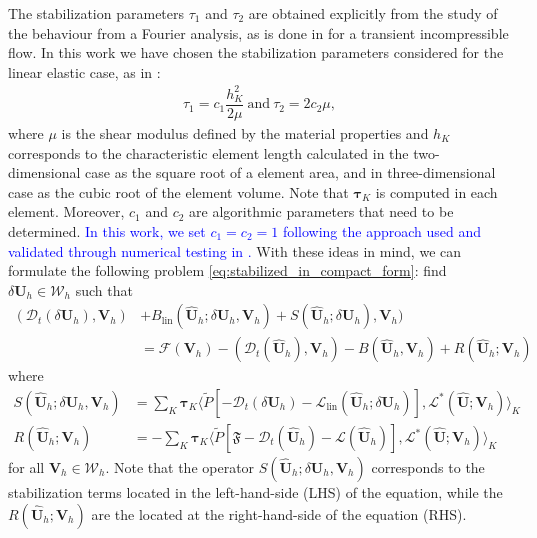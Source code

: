 \documentclass[11pt,english]{article}
\newcommand{\LM}[1]{\textcolor{blue}{#1}}
\def\SpaceTotal{\boldsymbol{\mathcal{W}}}
\def\TestFunctions{\boldsymbol{V}}
\def\UnkVariables{\boldsymbol{U}}
\def\DerB{B_{\text{lin}}}
\def\D{\mathcal{D}}
\def\L{\mathcal{L}}
\def\DerL{\mathcal{L}_{\text{lin}}}
\begin{document}
    The stabilization parameters $\tau_1$ and $\tau_2$ are obtained explicitly from the study of the behaviour from a Fourier analysis, as is done in \cite{codina2002stabilized} for a transient incompressible flow. In this work we have chosen the stabilization parameters considered for the linear elastic case, as in \cite{cervera2010mixeda}:
        \begin{align}
            \tau_1=c_1\dfrac{h_K^2}{2\mu}\ \text{and}\  \tau_2=2c_2\mu, \label{eq:stab_parameters}
        \end{align}
    where $\mu$ is the shear modulus defined by the material properties and $h_K$ corresponds to the characteristic element length calculated in the two-dimensional case as the square root of a element area, and in three-dimensional case as the cubic root of the element volume. Note that $\boldsymbol{\tau}_K$ is computed in each element. Moreover, $c_1$ and $c_2$ are algorithmic parameters that need to be determined. \LM{In this work, we set $c_1=c_2=1$ following the approach used and validated through numerical testing in \cite{cervera2003mixed}.} With these ideas in mind, we can formulate the following problem \eqref{eq:stabilized_in_compact_form}: find $\delta \UnkVariables_h\in\SpaceTotal_h$ such that
    \begin{align}
        \left(\mathcal{D}_t\left( \delta \UnkVariables_h \right),\TestFunctions_h \right) &+ \DerB (\hat{\UnkVariables}_h;\delta \UnkVariables_h,\TestFunctions_h) +  S(\hat{\UnkVariables}_h;\delta \UnkVariables_h),\boldsymbol{V}_h) \nonumber \\ 
        &= \mathcal{F}\left(\TestFunctions_h\right)  -(\mathcal{D}_t(\hat{\UnkVariables}_h),\TestFunctions_h) -B(\hat{\UnkVariables}_h,\TestFunctions_h)  + R(\hat{\UnkVariables}_h;\boldsymbol{V}_h) \label{eq:stabilized_in_compact_form2}
    \end{align}
where
\begin{align*}
    S(\hat{\UnkVariables}_h;\delta \UnkVariables_h,\boldsymbol{V}_h) &= \sum_K \boldsymbol{\tau}_K\langle\tilde{P}[
    -\D_t\left(\delta\UnkVariables_h\right)-\DerL(\hat{\UnkVariables}_h;\delta\UnkVariables_h) 
    ], \mathcal{L}^*(\hat{\UnkVariables};\boldsymbol{V}_h)\rangle_K\\ R(\hat{\UnkVariables}_h;\boldsymbol{V}_h) &= - \sum_K \boldsymbol{\tau}_K\langle\tilde{P}[\mathfrak{F}-\D_t(\hat{\UnkVariables}_h)-\L(\hat{\UnkVariables}_h) ], \mathcal{L}^*(\hat{\UnkVariables}; \boldsymbol{V}_h)\rangle_K
\end{align*}
   for all $\TestFunctions_h \in \SpaceTotal_h$. Note that the operator $S(\hat{\UnkVariables}_h;\delta \UnkVariables_h,\boldsymbol{V}_h)$ corresponds to the stabilization terms located in the left-hand-side (LHS) of the equation, while the $R(\hat{\UnkVariables}_h;\boldsymbol{V}_h)$ are the located at the right-hand-side of the equation (RHS). 
\end{document}
